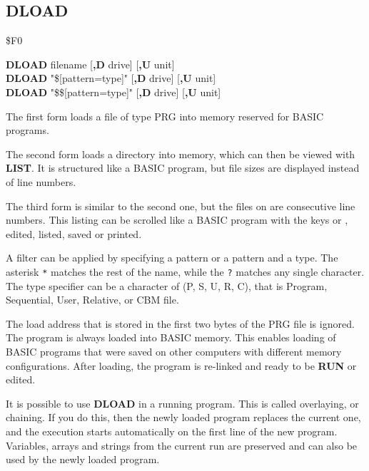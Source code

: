 \subsection{DLOAD}
\begin{description}[leftmargin=2cm,style=nextline]
\item [Token:]    \$F0
\item [Format:]   {\bf DLOAD} filename [{\bf,D} drive] [{\bf,U} unit] \\
                  {\bf DLOAD} "\$[pattern=type]" [{\bf,D} drive] [{\bf,U} unit] \\
                  {\bf DLOAD} "\$\$[pattern=type]" [{\bf,D} drive] [{\bf,U} unit]

\item [Usage:]    The first form loads a file of type PRG into memory reserved for BASIC programs.

                  The second form loads a directory into memory, which can then be viewed with {\bf LIST}. It is structured like a BASIC program, but file sizes are displayed instead of line numbers.

                  The third form is similar to the second one, but the files on are consecutive line numbers. This listing can be scrolled like a BASIC program with the keys  or , edited, listed, saved or printed.

                  A filter can be applied by specifying a pattern or a pattern and a type. The asterisk \texttt{*} matches the rest of the name, while the \texttt{?} matches any single character. The type specifier can be a character of (P, S, U, R, C), that is Program, Sequential, User, Relative, or CBM file.

                  \filenamedefinition

                  \drivedefinition

                  \unitdefinition

\item [Remarks:]  The load address that is stored in the first two bytes of the PRG file is ignored. The program is always loaded into BASIC memory. This enables loading of BASIC programs that were saved on other computers with different memory configurations. After loading, the program is re-linked and ready to be {\bf RUN} or edited.

                  It is possible to use {\bf DLOAD} in a running program. This is called overlaying, or chaining. If you do this, then the newly loaded program replaces the current one, and the execution starts automatically on the first line of the new program. Variables, arrays and strings from the current run are preserved and can also be used by the newly loaded program.


\end{description}

